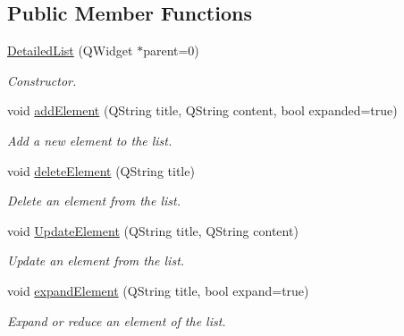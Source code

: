 \subsection*{Public Member Functions}
\begin{DoxyCompactItemize}
\item 
\hyperlink{classDetailedList_a82c17dba7dd2bc10317a3b9953cf8943}{Detailed\+List} (Q\+Widget $\ast$parent=0)
\begin{DoxyCompactList}\small\item\em Constructor. \end{DoxyCompactList}\item 
void \hyperlink{classDetailedList_aed40208f4a912b1ecfd3eba7ea2c9233}{add\+Element} (Q\+String title, Q\+String content, bool expanded=true)
\begin{DoxyCompactList}\small\item\em Add a new element to the list. \end{DoxyCompactList}\item 
void \hyperlink{classDetailedList_a9dc4572da2e70fb893740b3ed9dc0b40}{delete\+Element} (Q\+String title)
\begin{DoxyCompactList}\small\item\em Delete an element from the list. \end{DoxyCompactList}\item 
void \hyperlink{classDetailedList_abbe080f0713ea7c73839573968a1fb3c}{Update\+Element} (Q\+String title, Q\+String content)
\begin{DoxyCompactList}\small\item\em Update an element from the list. \end{DoxyCompactList}\item 
void \hyperlink{classDetailedList_a507c96247c3b608b357601e8a0acc4ac}{expand\+Element} (Q\+String title, bool expand=true)
\begin{DoxyCompactList}\small\item\em Expand or reduce an element of the list. \end{DoxyCompactList}\end{DoxyCompactItemize}
